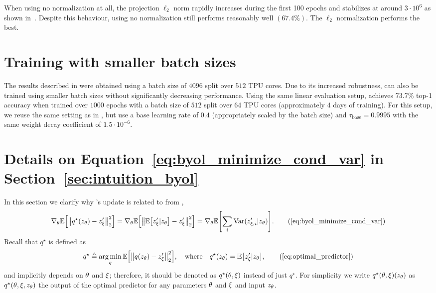 When using no normalization at all, the projection $\ell_2$ norm rapidly increases during the first 100 epochs and stabilizes at around $3\cdot 10^6$ as shown in~. Despite this behaviour, using no normalization still performs reasonably well $(67.4\%)$. The $\ell_2$ normalization performs the best. %


\section{Training with smaller batch sizes}\label{app:smaller-batch}
The results described in  were obtained using a batch size of $4096$ split over $512$ TPU cores. Due to its increased robustness, \algo can also be trained using smaller batch sizes without significantly decreasing performance. Using the same linear evaluation setup, \algo achieves $73.7\%$ top-1 accuracy when trained over $1000$ epochs with a batch size of $512$ split over $64$ TPU cores (approximately $4$ days of training). For this setup, we reuse the same setting as in , but use a base learning rate of $0.4$ (appropriately scaled by the batch size) and $\tau_\text{base} = 0.9995$ with the same weight decay coefficient of $1.5 \cdot 10^{-6}$.


\section{Details on Equation~\ref{eq:byol_minimize_cond_var} in Section~\ref{sec:intuition_byol}}
\label{app:thm-envelope}

In this section we clarify why \algo's update is related to  from ,
\begin{align}
    \nabla_\netparams\EE{\normtwo{q^\star(z_\netparams) - z'_\targetparams}^2} = \nabla_\netparams\EE{\normtwo{\EE{z'_\targetparams | z_\netparams} -z'_\targetparams }^2} = \nabla_\netparams \EE{ \sum_i \var(z'_{\targetparams, i} | z_\netparams)}. \tag{\ref{eq:byol_minimize_cond_var}}
\end{align}
Recall that $q^\star$ is defined as
\begin{align}
    q^\star \eqdef \argmin_q \EE{\normtwo{q(z_\netparams) - z'_\targetparams}^2}, \quad\text{where}\quad q^\star(z_\netparams) = \EE{z'_\targetparams | z_\netparams},
    \tag{\ref{eq:optimal_predictor}}
\end{align}
and implicitly depends on ${\theta}$ and $\xi$; therefore, it should be denoted as $q^\star({\theta}, \xi)$ instead of just $q^\star$. For simplicity we  write $q^\star({\theta}, \xi)(z_{\theta})$ as $q^\star({\theta}, \xi, z_{\theta})$ the output of the optimal predictor for any parameters ${\theta}$ and $\xi$ and input $z_{\theta}$. 

